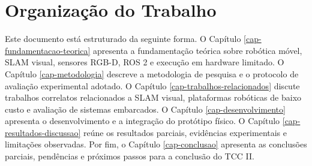 \section{Organização do Trabalho}

Este documento está estruturado da seguinte forma. O Capítulo \ref{cap-fundamentacao-teorica} apresenta a fundamentação teórica sobre robótica móvel, SLAM visual, sensores RGB-D, ROS 2 e execução em hardware limitado. O Capítulo \ref{cap-metodologia} descreve a metodologia de pesquisa e o protocolo de avaliação experimental adotado. O Capítulo \ref{cap-trabalhos-relacionados} discute trabalhos correlatos relacionados a SLAM visual, plataformas robóticas de baixo custo e avaliação de sistemas embarcados. O Capítulo \ref{cap-desenvolvimento} apresenta o desenvolvimento e a integração do protótipo físico. O Capítulo \ref{cap-resultados-discussao} reúne os resultados parciais, evidências experimentais e limitações observadas. Por fim, o Capítulo \ref{cap-conclusao} apresenta as conclusões parciais, pendências e próximos passos para a conclusão do TCC II.
